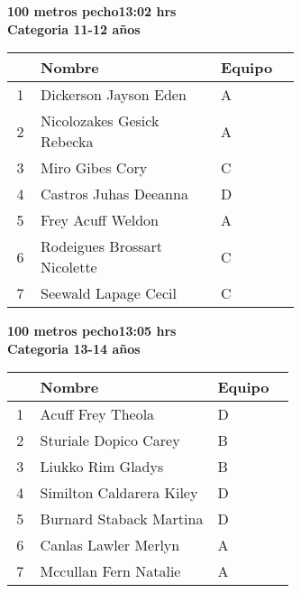 \begin{minipage}{0.95\linewidth}\vspace{0.5cm} 
\begin{flushleft}
\textbf{
\hspace{-0.15cm}100 metros pecho\hspace{1.5cm}13:02 hrs \\Categoria 11-12 años}\vspace{-0.2cm} 
\end{flushleft}
\begin{tabular}{cp{0.63\linewidth}l}
\hline
& \textbf{Nombre} & \textbf{Equipo} \\ \hline
1 & Dickerson Jayson Eden & A \\ 
2 & Nicolozakes Gesick Rebecka & A \\ 
3 & Miro Gibes Cory & C \\ 
4 & Castros Juhas Deeanna & D \\ 
5 & Frey Acuff Weldon & A \\ 
6 & Rodeigues Brossart Nicolette & C \\ 
7 & Seewald Lapage Cecil & C \\ 
\end{tabular}
\end{minipage}
\begin{minipage}{0.95\linewidth}\vspace{0.5cm} 
\begin{flushleft}
\textbf{
\hspace{-0.15cm}100 metros pecho\hspace{1.5cm}13:05 hrs \\Categoria 13-14 años}\vspace{-0.2cm} 
\end{flushleft}
\begin{tabular}{cp{0.63\linewidth}l}
\hline
& \textbf{Nombre} & \textbf{Equipo} \\ \hline
1 & Acuff Frey Theola & D \\ 
2 & Sturiale Dopico Carey & B \\ 
3 & Liukko Rim Gladys & B \\ 
4 & Similton Caldarera Kiley & D \\ 
5 & Burnard Staback Martina & D \\ 
6 & Canlas Lawler Merlyn & A \\ 
7 & Mccullan Fern Natalie & A \\ 
\end{tabular}
\end{minipage}
